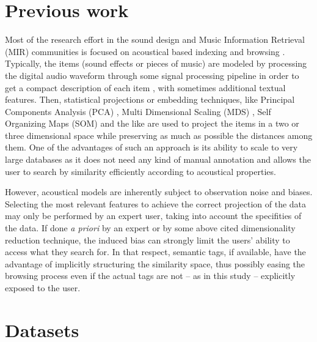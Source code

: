 \documentclass{aes2e}
\begin{document}
\section{Previous work} \label{previous}

Most of the research effort in the sound design and Music Information Retrieval (MIR) communities is focused on acoustical based indexing and browsing \cite{tzanetakis2003musescape, streich2008music,goto2005musicream,pampalk2007musicsun}. Typically, the items (sound effects or pieces of music) are modeled by processing the digital audio waveform through some signal processing pipeline in order to get a compact description of each item
\cite{coleman2007mused}, with sometimes additional textual features. Then, statistical projections or embedding techniques, like Principal Components Analysis (PCA) \cite{MusicBox},  Multi Dimensional Scaling (MDS) \cite{schwarz2009sound,Cano2002}, Self Organizing Maps (SOM) \cite{pampalk2004exploring,pampalk2006musicrainbow,knees2006innovative} and the like are used to project the items in a two or three dimensional space while preserving as much as possible the distances among them. One of the advantages of such an approach is its ability to scale to very large databases \cite{schwarz2009scalability} as it does not need any kind of manual annotation and allows the user to search by similarity efficiently according to acoustical properties.

However, acoustical models are inherently subject to observation noise and biases. Selecting the most relevant features to achieve the correct projection of the data may only be performed by an expert user, taking into account the specifities of the data. If done \textit{a priori} by an expert or by some above cited dimensionality reduction technique, the induced bias can strongly limit the users' ability to access what they search for. In that respect, semantic tags, if available, have the advantage of implicitly structuring the similarity space, thus possibly easing the browsing process even if the actual tags are not -- as in this study -- explicitly exposed to the user.

\section{Datasets} \label{dataset}
\end{document}
